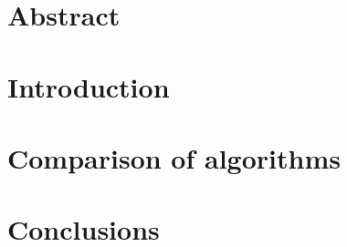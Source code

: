 \documentclass{scrartcl}
\title{\mytitle}
\author{\myauthor}
\date{\today}
\begin{document}
\maketitle

\section*{Abstract}

\section{Introduction}

\cite{polylogarithm}

\section{Comparison of algorithms}

\section{Conclusions}



\end{document}
